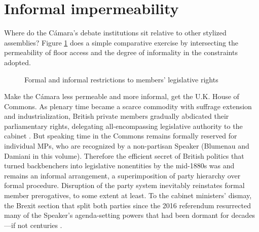 \documentclass[letter,12pt]{article}
\begin{document}
\section{Informal impermeability} %


Where do the Cámara's debate institutions sit relative to other stylized assemblies? Figure \ref{F:comparison} does a simple comparative exercise by intersecting the permeability of floor access and the degree of informality in the constraints adopted.

\begin{figure}
  \centering
\caption{Formal and informal restrictions to members' legislative rights}\label{F:comparison}
\end{figure}

Make the Cámara less permeable and more informal, get the U.K. House of Commons. As plenary time became a scarce commodity with suffrage extension and industrialization, British private members gradually abdicated their parliamentary rights, delegating all-encompassing legislative authority to the cabinet \citep{cox.1987}. But speaking time in the Commons remains formally reserved for individual MPs, who are recognized by a non-partisan Speaker (Blumenau and Damiani in this volume). Therefore the efficient secret of British politics that turned backbenchers into legislative nonentities by the mid-1880s was and remains an informal arrangement, a superimposition of party hierarchy over formal procedure. Disruption of the party system inevitably reinstates formal member prerogatives, to some extent at least. To the cabinet ministers' dismay, the Brexit section that split both parties since the 2016 referendum resurrected many of the Speaker's agenda-setting powers that had been dormant for decades---if not centuries \citep{economist-bercow.2019}.
\end{document}

